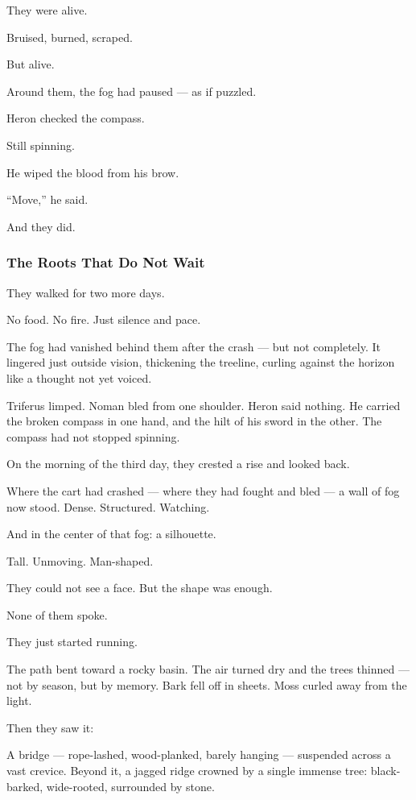 \documentclass[12pt]{article}
\begin{document}
They were alive.

Bruised, burned, scraped.

But alive.

Around them, the fog had paused — as if puzzled.

Heron checked the compass.

Still spinning.

He wiped the blood from his brow.

“Move,” he said.

And they did.

\dotfill

\subsubsection*{The Roots That Do Not Wait}

They walked for two more days.

No food. No fire. Just silence and pace.

The fog had vanished behind them after the crash — but not completely. It lingered just outside vision, thickening the treeline, curling against the horizon like a thought not yet voiced.

Triferus limped. Noman bled from one shoulder. Heron said nothing. He carried the broken compass in one hand, and the hilt of his sword in the other. The compass had not stopped spinning.

\bigskip

On the morning of the third day, they crested a rise and looked back.

Where the cart had crashed — where they had fought and bled — a wall of fog now stood. Dense. Structured. Watching.

And in the center of that fog: a silhouette.

Tall. Unmoving. Man-shaped.

They could not see a face. But the shape was enough.

None of them spoke.

They just started running.

\bigskip

The path bent toward a rocky basin. The air turned dry and the trees thinned — not by season, but by memory. Bark fell off in sheets. Moss curled away from the light.

Then they saw it:

A bridge — rope-lashed, wood-planked, barely hanging — suspended across a vast crevice. Beyond it, a jagged ridge crowned by a single immense tree: black-barked, wide-rooted, surrounded by stone.
\end{document}
